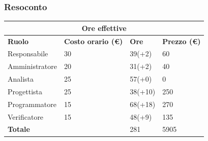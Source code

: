 \documentclass[9pt]{article}
\begin{document}
\subsubsection{Resoconto}
\begin{center}
	\begin{tabularx}{\textwidth}{|X|X|X|X|}
		\hline
		\multicolumn{4}{|c|}{\textbf{Ore effettive}}                                      \\
		\hline
		\hline
		\textbf{Ruolo}  & \textbf{Costo orario (\euro)} & \textbf{Ore} & \textbf{Prezzo (\euro)} \\
		\hline
		Responsabile    & 30                            & 39(+2)       & 60                      \\
		\hline
		Amministratore  & 20                            & 31(+2)       & 40                      \\
		\hline
		Analista        & 25                            & 57(+0)       & 0                       \\
		\hline
		Progettista     & 25                            & 38(+10)       & 250                     \\
		\hline
		Programmatore   & 15                            & 68(+18)       & 270                     \\
		\hline
		Verificatore    & 15                            & 48(+9)       & 135                      \\
		\hline
		\hline
		\textbf{Totale} &                               & 281          & 5905                    \\
		\hline
	\end{tabularx}\\[8pt]
	\mbox{}\\
\end{center}
\end{document}
